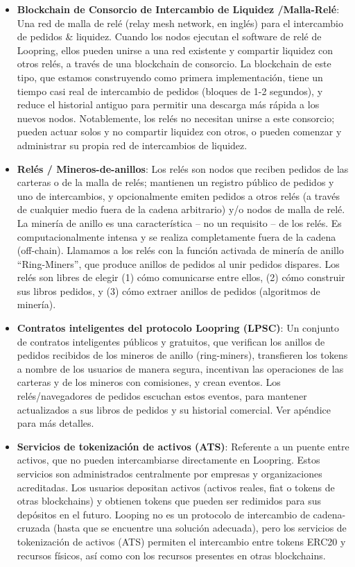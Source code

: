\documentclass[UTF8,nofonts]{article}
\begin{document}
\begin{multicols}{2}
\begin{itemize}
\item \textbf {Blockchain de Consorcio de Intercambio de Liquidez /Malla-Rel\'e}: Una red de malla de rel\'e (relay mesh network, en ingl\'es) para el intercambio de pedidos \& liquidez. Cuando los nodos ejecutan el software de rel\'e de Loopring, ellos pueden unirse a una red existente y compartir liquidez con otros rel\'es, a trav\'es de una blockchain de consorcio. La blockchain de este tipo, que estamos construyendo como primera implementaci\'on, tiene un tiempo casi real de intercambio de pedidos (bloques de 1-2 segundos), y reduce el historial antiguo para permitir una descarga m\'as r\'apida a los nuevos nodos. Notablemente, los rel\'es no necesitan unirse a este consorcio; pueden actuar solos y no compartir liquidez con otros, o pueden comenzar y administrar su propia red de intercambios de liquidez.


\item \textbf{Rel\'es / Mineros-de-anillos}: Los rel\'es son nodos que reciben pedidos de las carteras o de la malla de rel\'es; mantienen un registro p\'ublico de pedidos y uno de intercambios, y opcionalmente emiten pedidos a otros rel\'es (a trav\'es de cualquier medio fuera de la cadena arbitrario) y/o nodos de malla de rel\'e. La miner\'ia de anillo es una caracter\'istica -- no un requisito -- de los rel\'es. Es computacionalmente intensa y se realiza completamente fuera de la cadena (off-chain). Llamamos a los rel\'es con la funci\'on activada de miner\'ia de anillo \enquote{Ring-Miners}, que produce anillos de pedidos al unir pedidos dispares. Los rel\'es son libres de elegir (1) c\'omo comunicarse entre ellos, (2) c\'omo construir sus libros pedidos, y (3) c\'omo extraer anillos de pedidos (algoritmos de miner\'ia).


\item \textbf{Contratos inteligentes del protocolo Loopring (LPSC)}: Un conjunto de contratos inteligentes p\'ublicos y gratuitos, que verifican los anillos de pedidos recibidos de los mineros de anillo (ring-miners), transfieren los tokens a nombre de los usuarios de manera segura, incentivan las operaciones de las carteras y de los mineros con comisiones, y crean eventos. Los rel\'es/navegadores de pedidos escuchan estos eventos, para mantener actualizados a sus libros de pedidos y su historial comercial. Ver ap\'endice para m\'as detalles. %

\item \textbf{Servicios de tokenizaci\'on de activos (ATS)}: Referente a un puente entre activos, que no pueden intercambiarse directamente en Loopring. Estos servicios son administrados centralmente por empresas y organizaciones acreditadas. Los usuarios depositan activos (activos reales, fiat o tokens de otras blockchains) y obtienen tokens que pueden ser redimidos para sus dep\'ositos en el futuro. Looping no es un protocolo de intercambio de cadena-cruzada (hasta que se encuentre una soluci\'on adecuada), pero los servicios de tokenizaci\'on de activos (ATS) permiten el intercambio entre tokens ERC20 \cite{ERC20} y recursos f\'isicos, as\'i como con los recursos presentes en otras blockchains.


\end{itemize}
\end{multicols}
\end{document}
